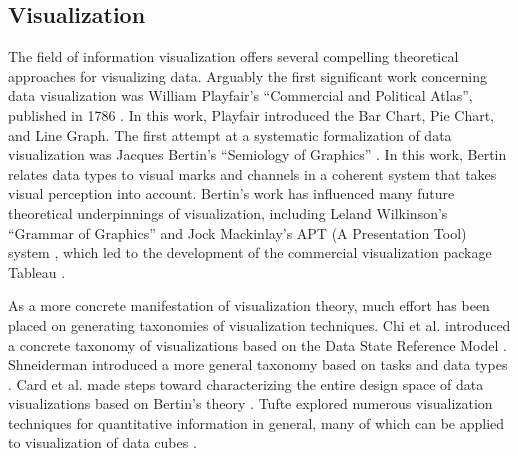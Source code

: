 \documentclass[12pt]{article}
\begin{document}
\begin{doublespace}
\subsection{Visualization}
The field of information visualization offers several compelling theoretical approaches for visualizing data. Arguably the first significant work concerning data visualization was William Playfair's ``Commercial and Political Atlas'', published in 1786 \cite{playfair1786commercial}. In this work, Playfair introduced the Bar Chart, Pie Chart, and Line Graph. The first attempt at a systematic formalization of data visualization was Jacques Bertin's ``Semiology of Graphics'' \cite{bertin1983semiology}. In this work, Bertin relates data types to visual marks and channels in a coherent system that takes visual perception into account. Bertin's work has influenced many future theoretical underpinnings of visualization, including Leland Wilkinson's ``Grammar of Graphics'' \cite{wilkinson2005grammar} and Jock Mackinlay's APT (A Presentation Tool) system \cite{mackinlay1986automating}, which led to the development of the commercial visualization package Tableau \cite{hanrahan2007visual}.

As a more concrete manifestation of visualization theory, much effort has been placed on generating taxonomies of visualization techniques. Chi et al. introduced a concrete taxonomy of visualizations \cite{chi2000taxonomy} based on the Data State Reference Model \cite{chi1998operator}. Shneiderman introduced a more general taxonomy based on tasks and data types \cite{shneiderman1996eyes}. Card et al. made steps toward characterizing the entire design space of data visualizations based on Bertin's theory \cite{card1997structure}. Tufte explored numerous visualization techniques for quantitative information in general, many of which can be applied to visualization of data cubes \cite{tufte1983visual}.


\end{doublespace}
\end{document}
